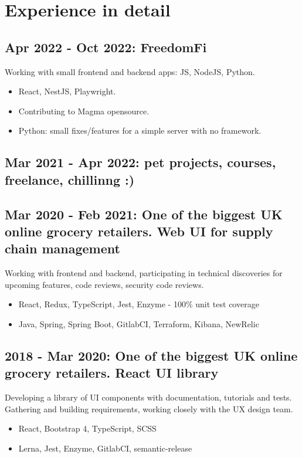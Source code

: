 \documentclass[a4paper, 14pt]{article}
\begin{document}
\section{Experience in detail}
  \subsection{Apr 2022 - Oct 2022: FreedomFi}
    Working with small frontend and backend apps: JS, NodeJS, Python.
    \begin{itemize}
      \item React, NestJS, Playwright. \\
      \item Contributing to Magma opensource. \\
      \item Python: small fixes/features for a simple server with no framework.
    \end{itemize}
  \subsection{Mar 2021 - Apr 2022: pet projects, courses, freelance, chillinng :)}
  \subsection{Mar 2020 - Feb 2021: One of the biggest UK online grocery retailers. Web UI for supply chain management}
  Working with frontend and backend, participating in technical discoveries for upcoming features, code reviews, security code reviews.
    \begin{itemize}
      \item React, Redux, TypeScript, Jest, Enzyme - 100\% unit test coverage \\
      \item Java, Spring, Spring Boot, GitlabCI, Terraform, Kibana, NewRelic
    \end{itemize}
  \subsection{2018 - Mar 2020: One of the biggest UK online grocery retailers. React UI library}
    Developing a library of UI components with documentation, tutorials and tests. \\
    Gathering and building requirements, working closely with the UX design team.
    \begin{itemize}
      \item React, Bootstrap 4, TypeScript, SCSS \\ 
      \item Lerna, Jest, Enzyme, GitlabCI, semantic-release
    \end{itemize}
\end{document}
